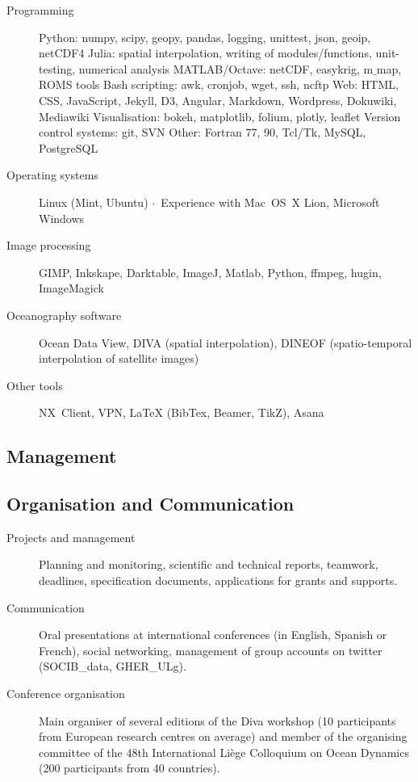 \documentclass[11pt,a4paper,svgnames]{article}
\newcommand{\sepa}{$\cdot$~}
\begin{document}
\begin{description}

\item[Programming] {Python: numpy, scipy, geopy, pandas, logging, unittest, json, geoip, netCDF4\newline
Julia: spatial interpolation, writing of modules/functions, unit-testing, numerical analysis\newline
MATLAB/Octave: netCDF, easykrig, m$\_$map, ROMS tools \newline
Bash scripting: awk, cronjob, wget, ssh, ncftp\newline
Web: HTML, CSS, JavaScript, Jekyll, D3, Angular, Markdown, Wordpress, Dokuwiki, Mediawiki\newline
Visualisation: bokeh, matplotlib, folium, plotly, leaflet\newline
Version control systems: git, SVN \newline
Other: Fortran 77, 90, Tcl/Tk, MySQL, PostgreSQL}
\item[Operating systems]{Linux (Mint, Ubuntu) \sepa Experience with Mac~OS~X Lion, Microsoft Windows}
\item[Image processing]{GIMP, Inkskape, Darktable, ImageJ, Matlab, Python, ffmpeg, hugin, ImageMagick}
\item[Oceanography software]{Ocean Data View, DIVA (spatial interpolation), DINEOF (spatio-temporal interpolation of satellite images)}
\item[Other tools]{NX~Client, VPN, LaTeX (BibTex, Beamer, TikZ), Asana}
\end{description}


\subsection{Management}

\subsection{Organisation and Communication}

\begin{description}
\item[Projects and management]{Planning and monitoring, scientific and technical reports, teamwork, deadlines, specification documents, applications for grants and supports.}

\item[Communication] {Oral presentations at international conferences (in English, Spanish or French), social networking, management of group accounts on twitter (SOCIB\_data, GHER\_ULg).}

\item[Conference organisation]{Main organiser of several editions of the Diva workshop (10 participants from European research centres on average) and member of the organising committee of the 48th International Li\`{e}ge Colloquium on Ocean Dynamics (200 participants from 40 countries).}

\end{description}
\end{document}
